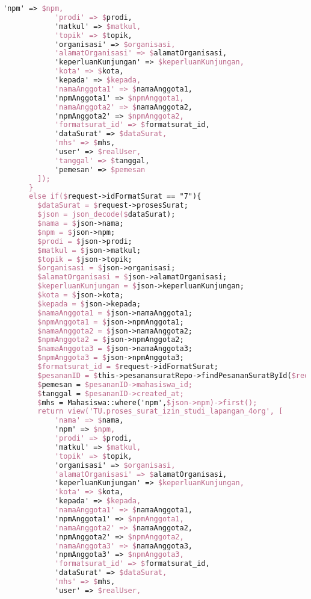 \begin{lstlisting}[language=tex,basicstyle=\tiny,caption=PesanansuratController.php]
            'npm' => $npm,
            'prodi' => $prodi,
            'matkul' => $matkul,
            'topik' => $topik,
            'organisasi' => $organisasi,
            'alamatOrganisasi' => $alamatOrganisasi,
            'keperluanKunjungan' => $keperluanKunjungan,
            'kota' => $kota,
            'kepada' => $kepada,
            'namaAnggota1' => $namaAnggota1,
            'npmAnggota1' => $npmAnggota1,
            'namaAnggota2' => $namaAnggota2,
            'npmAnggota2' => $npmAnggota2,
            'formatsurat_id' => $formatsurat_id,
            'dataSurat' => $dataSurat,
            'mhs' => $mhs,
            'user' => $realUser,
            'tanggal' => $tanggal,
            'pemesan' => $pemesan
        ]);
      }
      else if($request->idFormatSurat == "7"){
        $dataSurat = $request->prosesSurat;
        $json = json_decode($dataSurat);
        $nama = $json->nama;
        $npm = $json->npm;
        $prodi = $json->prodi;
        $matkul = $json->matkul;
        $topik = $json->topik;
        $organisasi = $json->organisasi;
        $alamatOrganisasi = $json->alamatOrganisasi;
        $keperluanKunjungan = $json->keperluanKunjungan;
        $kota = $json->kota;
        $kepada = $json->kepada;
        $namaAnggota1 = $json->namaAnggota1;
        $npmAnggota1 = $json->npmAnggota1;
        $namaAnggota2 = $json->namaAnggota2;
        $npmAnggota2 = $json->npmAnggota2;
        $namaAnggota3 = $json->namaAnggota3;
        $npmAnggota3 = $json->npmAnggota3;
        $formatsurat_id = $request->idFormatSurat;
        $pesananID = $this->pesanansuratRepo->findPesananSuratById($request->id);
        $pemesan = $pesananID->mahasiswa_id;
        $tanggal = $pesananID->created_at;
        $mhs = Mahasiswa::where('npm',$json->npm)->first();
        return view('TU.proses_surat_izin_studi_lapangan_4org', [
            'nama' => $nama,
            'npm' => $npm,
            'prodi' => $prodi,
            'matkul' => $matkul,
            'topik' => $topik,
            'organisasi' => $organisasi,
            'alamatOrganisasi' => $alamatOrganisasi,
            'keperluanKunjungan' => $keperluanKunjungan,
            'kota' => $kota,
            'kepada' => $kepada,
            'namaAnggota1' => $namaAnggota1,
            'npmAnggota1' => $npmAnggota1,
            'namaAnggota2' => $namaAnggota2,
            'npmAnggota2' => $npmAnggota2,
            'namaAnggota3' => $namaAnggota3,
            'npmAnggota3' => $npmAnggota3,
            'formatsurat_id' => $formatsurat_id,
            'dataSurat' => $dataSurat,
            'mhs' => $mhs,
            'user' => $realUser,

\end{lstlisting}
